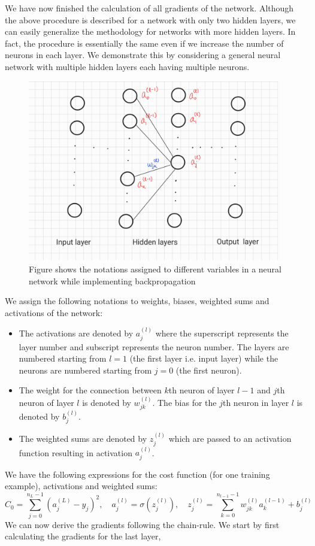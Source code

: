 We have now finished the calculation of all gradients of the network. Although the above procedure is described for a network with only two hidden layers, 
we can easily generalize the methodology for networks with more hidden layers. In fact, the procedure is essentially the same even if we increase the number of neurons
in each layer. We demonstrate this by considering a general neural network with multiple hidden layers each having multiple neurons. 
\begin{figure}
    \centering
        \includegraphics[width=.5\textwidth]{Figures/back_prop.jpg}
        \caption{Figure shows the notations assigned to different variables in a neural network while implementing backpropagation}
        \label{fig:back_p}
    \end{figure} 
We assign the following notations to weights, biases, weighted sums and activations of the network:
\begin{itemize}
    \item The activations are denoted by $a_j^{(l)}$ where the superscript represents the layer number and subscript represents the neuron number. The 
    layers are numbered starting from $l=1$ (the first layer i.e. input layer) while the neurons are numbered starting from $j=0$ (the first neuron).
    \item The weight for the connection between $k$th neuron of layer $l-1$ and $j$th neuron of layer $l$ is denoted by $w_{jk}^{(l)}$. The bias for the $j$th neuron in
    layer $l$ is denoted by $b_j^{(l)}$.
    \item The weighted sums are denoted by $z_j^{(l)}$ which are passed to an activation function resulting in activation $a_j^{(l)}$.
\end{itemize}
We have the following expressions for the cost function (for one training example), activations and weighted sums:
$$C_0 = \sum_{j=0}^{n_L -1} (a_j^{(L)} - y_j)^2, \quad a_j^{(l)} = \sigma(z_j^{(l)}), \quad z_j^{(l)} = \sum_{k=0}^{n_{l-1} -1} w_{jk}^{(l)}a_k^{(l-1)} + b_j^{(l)}$$
We can now derive the gradients following the chain-rule. We start by first calculating the gradients for the last layer,
